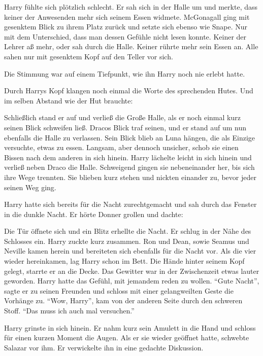Harry fühlte sich plötzlich schlecht. Er sah sich in der Halle um und merkte, dass keiner der Anwesenden mehr sich seinem Essen widmete. McGonagall ging mit gesenktem Blick zu ihrem Platz zurück und setzte sich ebenso wie Snape. Nur mit dem Unterschied, dass man dessen Gefühle nicht lesen konnte. Keiner der Lehrer aß mehr, oder sah durch die Halle. Keiner rührte mehr sein Essen an.  Alle sahen nur mit gesenktem Kopf auf den Teller vor sich.

Die Stimmung war auf einem Tiefpunkt, wie ihn Harry noch nie erlebt hatte.

Durch Harrys Kopf klangen noch einmal die Worte des sprechenden Hutes.  Und im selben Abstand wie der Hut brauchte: 

Schließlich stand er auf und verließ die Große Halle, als er noch einmal kurz seinen Blick schweifen ließ. Dracos Blick traf seinen, und er stand auf um nun ebenfalls die Halle zu verlassen. Sein Blick blieb an Luna hängen, die als Einzige versuchte, etwas zu essen. Langsam, aber dennoch unsicher, schob sie einen Bissen nach dem anderen in sich hinein. Harry lächelte leicht in sich hinein und verließ neben Draco die Halle. Schweigend gingen sie nebeneinander her, bis sich ihre Wege trennten. Sie blieben kurz stehen und nickten einander zu, bevor jeder seinen Weg ging.

Harry hatte sich bereits für die Nacht zurechtgemacht und sah durch das Fenster in die dunkle Nacht. Er hörte Donner grollen und dachte: 

Die Tür öffnete sich und ein Blitz erhellte die Nacht. Er schlug in der Nähe des Schlosses ein. Harry zuckte kurz zusammen. Ron und Dean, sowie Seamus und Neville kamen herein und bereiteten sich ebenfalls für die Nacht vor. Als die vier wieder hereinkamen, lag Harry schon im Bett. Die Hände hinter seinem Kopf gelegt, starrte er an die Decke. Das Gewitter war in der Zwischenzeit etwas lauter geworden. Harry hatte das Gefühl, mit jemandem reden zu wollen. \enquote{Gute Nacht}, sagte er zu seinen Freunden und schloss mit einer gelangweilten Geste die Vorhänge zu. \enquote{Wow, Harry}, kam von der anderen Seite durch den schweren Stoff. \enquote{Das muss ich auch mal versuchen.}

Harry grinste in sich hinein. Er nahm kurz sein Amulett in die Hand und schloss für einen kurzen Moment die Augen. Als er sie wieder geöffnet hatte, schwebte Salazar vor ihm. Er verwickelte ihn in eine gedachte Diskussion.


